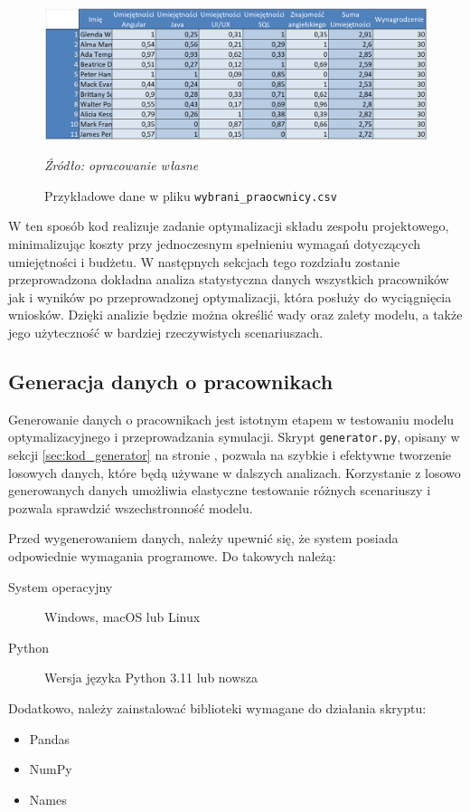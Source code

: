 \begin{description}
            \begin{figure}[H]
                \centering
                \includegraphics[width=\linewidth]{chapters/Images/wybrani_pracownicy_przyklad_csv.png}
                \cprotect\caption{Przykładowe dane w pliku \verb|wybrani_praocwnicy.csv|}
                \textit{Źródło: opracowanie własne} 
            \end{figure}
    \end{description}
    
    \par W ten sposób kod realizuje zadanie optymalizacji składu zespołu projektowego, minimalizując koszty przy jednoczesnym spełnieniu wymagań dotyczących umiejętności i budżetu. W następnych sekcjach tego rozdziału zostanie przeprowadzona dokładna analiza statystyczna danych wszystkich pracowników jak i wyników po przeprowadzonej optymalizacji, która posłuży do wyciągnięcia wniosków. Dzięki analizie będzie można określić wady oraz zalety modelu, a także jego użyteczność w bardziej rzeczywistych scenariuszach.

    \subsection{Generacja danych o pracownikach}\label{sec:generacja_danych}
    \par Generowanie danych o pracownikach jest istotnym etapem w testowaniu modelu optymalizacyjnego i przeprowadzania symulacji. Skrypt \verb|generator.py|, opisany w sekcji \ref{sec:kod_generator} na stronie \pageref{sec:kod_generator}, pozwala na szybkie i efektywne tworzenie losowych danych, które będą używane w dalszych analizach. Korzystanie z losowo generowanych danych umożliwia elastyczne testowanie różnych scenariuszy i pozwala sprawdzić wszechstronność modelu.
    
    \par Przed wygenerowaniem danych, należy upewnić się, że system posiada odpowiednie wymagania programowe. Do takowych należą:
    \begin{description}
        \item[System operacyjny] Windows, macOS lub Linux
        \item[Python] Wersja języka Python 3.11 lub nowsza 
    \end{description}
    Dodatkowo, należy zainstalować biblioteki wymagane do działania skryptu:
    \begin{itemize}
        \item Pandas
        \item NumPy
        \item Names
    \end{itemize}
    
